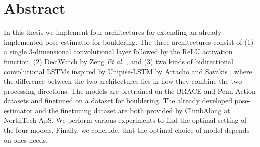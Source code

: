 \documentclass[./main.tex]{subfiles}
\begin{document}
\section*{Abstract}
In this thesis we implement four architectures for extending an already implemented pose-estimator for bouldering. The three architectures consist of (1) a single 3-dimensional convolutional layer followed by the ReLU activation function, (2) DeciWatch by Zeng \textit{Et al.} \cite{https://doi.org/10.48550/arxiv.2203.08713}, and (3) two kinds of bidirectional convolutional LSTMs inspired by Unipise-LSTM by Artacho and Savakis \cite{https://doi.org/10.48550/arxiv.2001.08095}, where the difference between the two architectures lies in how they combine the two processing directions. The models are pretrained on the BRACE and Penn Action datasets and finetuned on a dataset for bouldering. The already developed pose-estimator and the finetuning dataset are both provided by ClimbAlong at NorthTech ApS. We perform various experiments to find the optimal setting of the four models. Finally, we conclude, that the optimal choice of model depends on ones needs.
\end{document}
